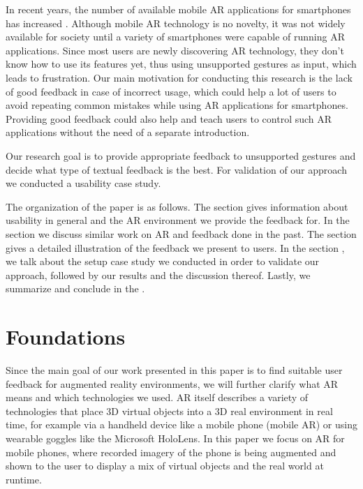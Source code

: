 \documentclass[11pt, a4paper]{article}
\begin{document}
		In recent years, the number of available mobile \ac{AR} applications for smartphones 
		has increased \cite{Tractica2017}. Although mobile \ac{AR} technology is no novelty, it was not widely available for 
		society until a variety of smartphones were capable of running AR applications. Since most 
		users are newly discovering \ac{AR} technology, they don't know how to use its features yet, thus using 
		unsupported gestures as input, which leads to frustration. Our main motivation for conducting this 
		research is the lack of good feedback in case of incorrect usage, which could help a lot of users to 
		avoid repeating common mistakes while using \ac{AR} applications for smartphones. Providing good feedback 
		could also help and teach users to control such \ac{AR} applications without the need of a separate introduction.

		Our research goal is to provide appropriate feedback to unsupported gestures and decide
		what type of textual feedback is the best. For validation of our approach we conducted a usability case study.

		The organization of the paper is as follows. The section  gives information about
		usability in general and the \ac{AR} environment we provide the feedback for. In the section  we discuss similar work on \ac{AR} and feedback done in the past. The  section
		gives a detailed illustration of the feedback we present to users. In the section , we
		talk about the setup case study we conducted in order to validate our approach, followed by
		our results and the discussion thereof. Lastly, we summarize and conclude in the .

	\pagestyle{myheadings}
	\section*{Foundations}\label{sec:foundations}
		Since the main goal of our work presented in this paper is to find suitable user feedback for augmented reality environments, we will further clarify what \ac{AR} means and which technologies we used. \ac{AR} itself describes a variety of technologies that place 3D virtual objects into a 3D real environment in real time, for example via a handheld device like a mobile phone (mobile \ac{AR}) or using wearable goggles like the Microsoft HoloLens. In this paper we focus on \ac{AR} for mobile phones, where recorded imagery of the phone is being augmented and shown to the user to display a mix of virtual objects and the real world at runtime.
\end{document}
